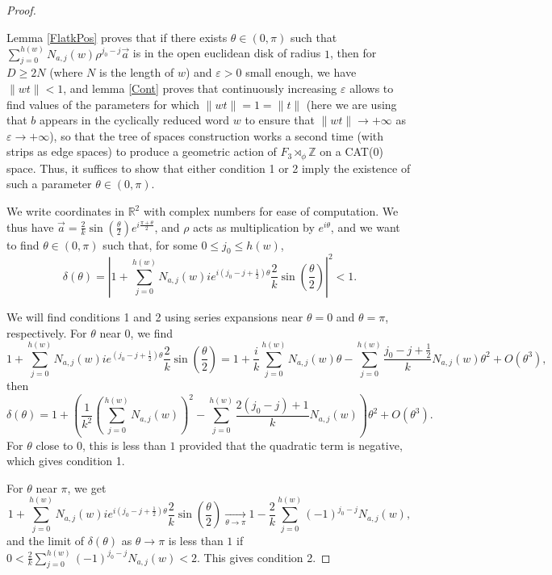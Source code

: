 \documentclass[10pt,a4paper]{amsart}
\newcommand{\R}{\mathbb{R}}
\newcommand{\Z}{\mathbb{Z}}
\newcommand{\eps}{\varepsilon}
\begin{document}
\begin{proof} ~

Lemma \ref{FlatkPos} proves that if there exists $\theta\in (0, \pi)$ such that $\sum_{j=0}^{h(w)}N_{a,j}(w)\rho^{j_0-j}\vec{a}$ is in the open euclidean disk of radius $1$, then for $D \ge 2N$ (where $N$ is the length of $w$) and $\eps > 0$ small enough, we have $\|wt\| < 1$, and lemma \ref{Cont} proves that continuously increasing $\eps$ allows to find values of the parameters for which $\|wt\| = 1 = \|t\|$ (here we are using that $b$ appears in the cyclically reduced word $w$ to ensure that $\|wt\|\longrightarrow +\infty$ as $\eps\longrightarrow +\infty$), so that the tree of spaces construction works a second time (with strips as edge spaces) to produce a geometric action of $F_3\rtimes_\phi\Z$ on a CAT(0) space. Thus, it suffices to show that either condition 1 or 2 imply the existence of such a parameter $\theta\in (0, \pi)$.


We write coordinates in $\R^2$ with complex numbers for ease of computation. We thus have $\vec{a} = \frac{2}{k}\sin(\frac{\theta}{2})e^{i\frac{\pi+\theta}{2}}$, and $\rho$ acts as multiplication by $e^{i\theta}$, and we want to find $\theta\in (0, \pi)$ such that, for some $0\le j_0\le h(w)$,
\[\delta(\theta) = \left|1 + \sum_{j=0}^{h(w)} N_{a,j}(w)ie^{i(j_0-j + \frac{1}{2})\theta}\frac{2}{k}\sin\left(\frac{\theta}{2}\right)\right|^2 < 1.\]

We will find conditions 1 and 2 using series expansions near $\theta=0$ and $\theta=\pi$, respectively. For $\theta$ near $0$, we find
\[1 + \sum_{j=0}^{h(w)} N_{a,j}(w)ie^{(j_0-j+\frac{1}{2})\theta}\frac{2}{k}\sin\left(\frac{\theta}{2}\right) = 1 + \frac{i}{k}\sum_{j=0}^{h(w)}N_{a,j}(w) \theta - \sum_{j=0}^{h(w)}\frac{j_0-j+\frac{1}{2}}{k}N_{a,j}(w)\theta^2 + O(\theta^3),\]
then
\[\delta(\theta) = 1 + \left(\frac{1}{k^2}\left(\sum_{j=0}^{h(w)} N_{a,j}(w)\right)^2 - \sum_{j=0}^{h(w)}\frac{2(j_0-j)+1}{k}N_{a,j}(w)\right)\theta^2 + O(\theta^3).\]
For $\theta$ close to $0$, this is less than $1$ provided that the quadratic term is negative, which gives condition 1.

For $\theta$ near $\pi$, we get
\[1 + \sum_{j=0}^{h(w)}N_{a,j}(w)ie^{i(j_0-j+\frac{1}{2})\theta}\frac{2}{k}\sin\left(\frac{\theta}{2}\right) \underset{\theta\longrightarrow \pi}{\longrightarrow} 1 - \frac{2}{k}\sum_{j=0}^{h(w)}(-1)^{j_0-j}N_{a,j}(w),\]
and the limit of $\delta(\theta)$ as $\theta\longrightarrow \pi$ is less than $1$ if $0 < \frac{2}{k}\sum_{j=0}^{h(w)}(-1)^{j_0-j}N_{a,j}(w) < 2$. 
This gives condition 2.

\end{proof}
\end{document}
